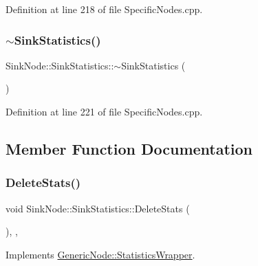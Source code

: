 Definition at line 218 of file Specific\+Nodes.\+cpp.

\mbox{\label{class_sink_node_1_1_sink_statistics_af8f01207bb1d835b89267a7857c08cb6}} 
\subsubsection{\texorpdfstring{$\sim$\+Sink\+Statistics()}{~SinkStatistics()}}
{\footnotesize\ttfamily Sink\+Node\+::\+Sink\+Statistics\+::$\sim$\+Sink\+Statistics (\begin{DoxyParamCaption}{ }\end{DoxyParamCaption})\hspace{0.3cm}{\ttfamily [inline]}}



Definition at line 221 of file Specific\+Nodes.\+cpp.



\subsection{Member Function Documentation}
\mbox{\label{class_sink_node_1_1_sink_statistics_a9bd64cbc1cbe5f75ae5bd4971a3453b0}} 
\subsubsection{\texorpdfstring{Delete\+Stats()}{DeleteStats()}}
{\footnotesize\ttfamily void Sink\+Node\+::\+Sink\+Statistics\+::\+Delete\+Stats (\begin{DoxyParamCaption}{ }\end{DoxyParamCaption})\hspace{0.3cm}{\ttfamily [inline]}, {\ttfamily [override]}, {\ttfamily [virtual]}}



Implements \hyperlink{class_generic_node_1_1_statistics_wrapper_a08f3642bccd77ccf4d7a8b7010559e1c}{Generic\+Node\+::\+Statistics\+Wrapper}.



